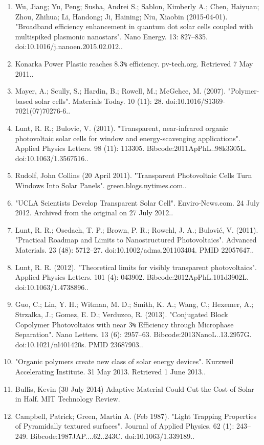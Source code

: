 \begin{enumerate}
\item Wu, Jiang; Yu, Peng; Susha, Andrei S.; Sablon, Kimberly A.; Chen, Haiyuan; Zhou, Zhihua; Li, Handong; Ji, Haining; Niu, Xiaobin (2015-04-01). "Broadband efficiency enhancement in quantum dot solar cells coupled with multispiked plasmonic nanostars". Nano Energy. 13: 827–835. doi:10.1016/j.nanoen.2015.02.012..
\item Konarka Power Plastic reaches 8.3\verb|%| efficiency. pv-tech.org. Retrieved 7 May 2011..
\item Mayer, A.; Scully, S.; Hardin, B.; Rowell, M.; McGehee, M. (2007). "Polymer-based solar cells". Materials Today. 10 (11): 28. doi:10.1016/S1369-7021(07)70276-6..
\item Lunt, R. R.; Bulovic, V. (2011). "Transparent, near-infrared organic photovoltaic solar cells for window and energy-scavenging applications". Applied Physics Letters. 98 (11): 113305. Bibcode:2011ApPhL..98k3305L. doi:10.1063/1.3567516..
\item Rudolf, John Collins (20 April 2011). "Transparent Photovoltaic Cells Turn Windows Into Solar Panels". green.blogs.nytimes.com..
\item "UCLA Scientists Develop Transparent Solar Cell". Enviro-News.com. 24 July 2012. Archived from the original on 27 July 2012..
\item Lunt, R. R.; Osedach, T. P.; Brown, P. R.; Rowehl, J. A.; Bulović, V. (2011). "Practical Roadmap and Limits to Nanostructured Photovoltaics". Advanced Materials. 23 (48): 5712–27. doi:10.1002/adma.201103404. PMID 22057647..
\item Lunt, R. R. (2012). "Theoretical limits for visibly transparent photovoltaics". Applied Physics Letters. 101 (4): 043902. Bibcode:2012ApPhL.101d3902L. doi:10.1063/1.4738896..
\item Guo, C.; Lin, Y. H.; Witman, M. D.; Smith, K. A.; Wang, C.; Hexemer, A.; Strzalka, J.; Gomez, E. D.; Verduzco, R. (2013). "Conjugated Block Copolymer Photovoltaics with near 3\verb|%| Efficiency through Microphase Separation". Nano Letters. 13 (6): 2957–63. Bibcode:2013NanoL..13.2957G. doi:10.1021/nl401420s. PMID 23687903..
\item "Organic polymers create new class of solar energy devices". Kurzweil Accelerating Institute. 31 May 2013. Retrieved 1 June 2013..
\item Bullis, Kevin (30 July 2014) Adaptive Material Could Cut the Cost of Solar in Half. MIT Technology Review.
\item Campbell, Patrick; Green, Martin A. (Feb 1987). "Light Trapping Properties of Pyramidally textured surfaces". Journal of Applied Physics. 62 (1): 243–249. Bibcode:1987JAP....62..243C. doi:10.1063/1.339189..

\end{enumerate}
